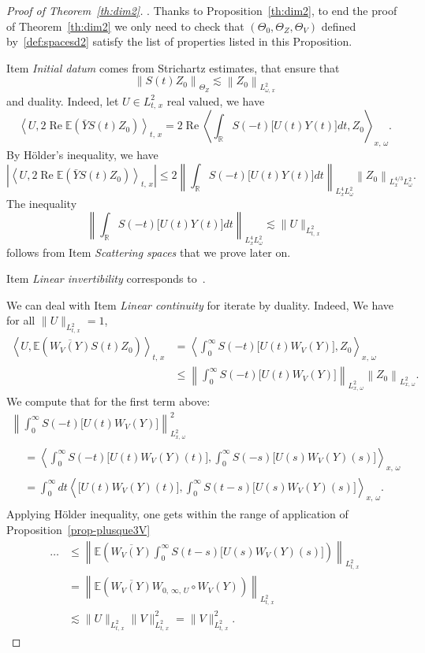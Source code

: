 \documentclass[10pt]{amsart}
\theoremstyle{definition}\newtheorem{defi}[theo]{Definition}\newtheorem{rema}[theo]{Remark}\newtheorem{exam}[theo]{Example}\newtheorem{exem}[theo]{Example}\newtheorem{nota}[theo]{Notation}
\newcommand{\R}{\mathbb{R}}
\newcommand{\E}{\mathbb{E}}
\DeclareMathOperator{\re}{Re}
\begin{document}
\begin{proof}[Proof of Theorem~\ref{th:dim2}].
Thanks to Proposition~\ref{th:dim2}, to end the proof of Theorem~\ref{th:dim2} we only need to check that $(\Theta_0,\Theta_Z,\Theta_V)$ defined by~\eqref{def:spacesd2} satisfy the list of properties listed in this Proposition.

Item \emph{Initial datum} comes from Strichartz estimates, that ensure that
\[
\left\|S(t)Z_0\right\|_{\Theta_Z} \lesssim \left\|Z_0\right\|_{L^2_{\omega,\,x}}
\]
and duality. Indeed, let $U \in L^2_{t,\,x}$ real valued, we have
\[
\left\langle U, 2\re \E \left(\bar Y S(t) Z_0\right)\right\rangle_{t,\,x} = 2\re \left\langle\int_{\R} S(-t) \big[U(t)Y(t)\big] dt, Z_0\right\rangle_{x,\,\omega}.
\]
By H\"older's inequality, we have
\[
\left|\left\langle U, 2\re \E \left(\bar Y S(t) Z_0\right)\right\rangle_{t,\,x}\right| \leq 2\left\|\int_{\R} S(-t) \big[U(t)Y(t)\big] dt\right\|_{L^4_x L^2_\omega} \left\|Z_0\right\|_{L^{4/3}_x L^2_\omega}.
\]
The inequality
\[
\left\|\int_{\R} S(-t) \big[U(t)Y(t)\big] dt\right\|_{L^4_x L^2_\omega} \lesssim \|U\|_{L^2_{t,\,x}}
\]
follows from Item \emph{Scattering spaces} that we prove later on.


Item \emph{Linear invertibility} corresponds to~\cite[Proposition~1 and Corollary~1]{lewsab2}.

We can deal with Item \emph{Linear continuity} for iterate by duality. Indeed, We have for all $\| U\|_{L^2_{t,\,x}}=1$,
\begin{align*}
\left\langle U,\E \left(\overline{W_V(Y)} S(t) Z_0\right)\right\rangle_{t,\,x} &= \left\langle\int_{0}^\infty S(-t) \big[U(t)W_V(Y)\big],Z_0\right\rangle_{x,\,\omega} \\
&\leq \left\| \int_{0}^\infty S(-t) \big[U(t)W_V(Y)\big]\right\|_{L^2_{x,\,\omega}} \left\|Z_0\right\|_{L^2_{x,\,\omega}}.
\end{align*}
We compute that for the first term above:
\begin{multline*}
\left\| \int_{0}^\infty S(-t) \big[U(t)W_V(Y)\big]\right\|_{L^2_{x,\,\omega}}^2\\
\begin{aligned}
& = \left\langle \int_{0}^\infty S(-t) \big[U(t)W_V(Y)(t)\big], \int_{0}^\infty S(-s)\big[U(s)W_V(Y)(s)\big]\right\rangle_{x,\,\omega} \\
& = \int_{0}^\infty dt \left\langle \big[U(t)W_V(Y)(t)\big], \int_{0}^\infty S(t-s)\big[U(s)W_V(Y)(s)\big]\right\rangle_{x,\,\omega}.
\end{aligned}
\end{multline*}
Applying H\"older inequality, one gets within the range of application of Proposition~\ref{prop-plusque3V}
\begin{align*}
\dots &\leq \left\| \E\left(\overline{W_V(Y)} \int_{0}^\infty S(t - s) \big[U(s)W_V(Y)(s)\big]\right) \right\|_{L^2_{t,\,x}}\\
&=\left\| \E\left(\overline{W_V(Y)} W_{0,\,\infty,\,U}\circ W_V(Y)\right)\right\|_{L^2_{t,\,x}}\\
&\lesssim \| U \|_{L^2_{t,\,x}} \| V \|_{L^2_{t,\,x}}^2 = \| V \|_{L^2_{t,\,x}}^2.
\end{align*}


\end{proof}
\end{document}
